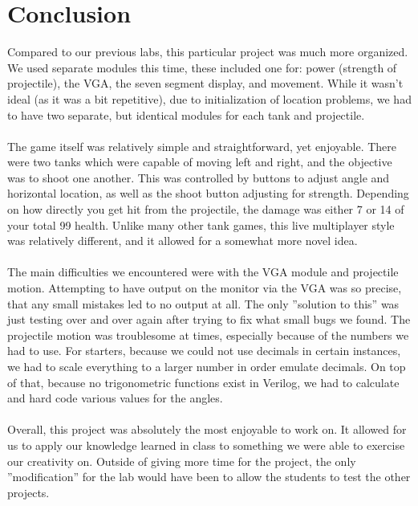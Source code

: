 \documentclass{article}
\begin{document}
\section*{Conclusion}

Compared to our previous labs, this particular project was much more organized.  We used separate modules this time, these included one for: power (strength of projectile), the VGA, the seven segment display, and movement.  While it wasn't ideal (as it was a bit repetitive), due to initialization of location problems, we had to have two separate, but identical modules for each tank and projectile.  
\\
\\
The game itself was relatively simple and straightforward, yet enjoyable.  There were two tanks which were capable of moving left and right, and the objective was to shoot one another.  This was controlled by buttons to adjust angle and horizontal location, as well as the shoot button adjusting for strength.  Depending on how directly you get hit from the projectile, the damage was either 7 or 14 of your total 99 health.  Unlike many other tank games, this live multiplayer style was relatively different, and it allowed for a somewhat more novel idea. 
\\
\\
The main difficulties we encountered were with the VGA module and projectile motion.  Attempting to have output on the monitor via the VGA was so precise, that any small mistakes led to no output at all.  The only ''solution to this'' was just testing over and over again after trying to fix what small bugs we found.  The projectile motion was troublesome at times, especially because of the numbers we had to use. For starters, because we could not use decimals in certain instances, we had to scale everything to a larger number in order emulate decimals.  On top of that, because no trigonometric functions exist in Verilog, we had to calculate and hard code various values for the angles.
\\
\\
Overall, this project was absolutely the most enjoyable to work on.  It allowed for us to apply our knowledge learned in class to something we were able to exercise our creativity on.  Outside of giving more time for the project, the only ''modification'' for the lab would have been to allow the students to test the other projects.  





%

%

\end{document}
